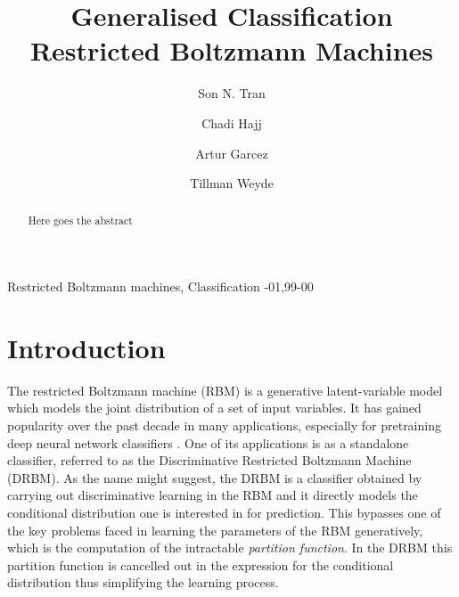 \documentclass[review]{elsarticle}
\begin{document}
\begin{frontmatter}

\title{Generalised Classification Restricted Boltzmann Machines}


\author[mymainaddress]{Son N. Tran}
\address[mymainaddress]{The Australian E-Health Research Centre, CSIRO}

\author[mysecondaryaddress]{Chadi Hajj}
\author[mysecondaryaddress]{Artur Garcez}
\author[mysecondaryaddress]{Tillman Weyde}
\address[mysecondaryaddress]{Department of Computer Science, City University of London}


\begin{abstract}
Here goes the abstract
\end{abstract}

\begin{keyword}
Restricted Boltzmann machines, Classification
-01\sep  99-00
\end{keyword}

\end{frontmatter}

\linenumbers
\section{Introduction}
\label{sec:introduction}
The restricted Boltzmann machine (RBM) is a generative latent-variable
model which models the joint distribution of a set of input variables.
It has gained popularity over the past decade in many applications,
especially for pretraining deep neural network classifiers
\cite{Hinton_2006,Mohamed2012}.  One of its applications is as a
standalone classifier, referred to as the Discriminative Restricted
Boltzmann Machine (DRBM)\cite{Larochelle2008}.  As the name might
suggest, the DRBM is a classifier obtained by carrying out
discriminative learning in the RBM and it directly models the
conditional distribution one is interested in for prediction. This
bypasses one of the key problems faced in learning the parameters of
the RBM generatively, which is the computation of the intractable
\textit{partition function}.  In the DRBM this partition function is
cancelled out in the expression for the conditional distribution thus
simplifying the learning process.
\end{document}

